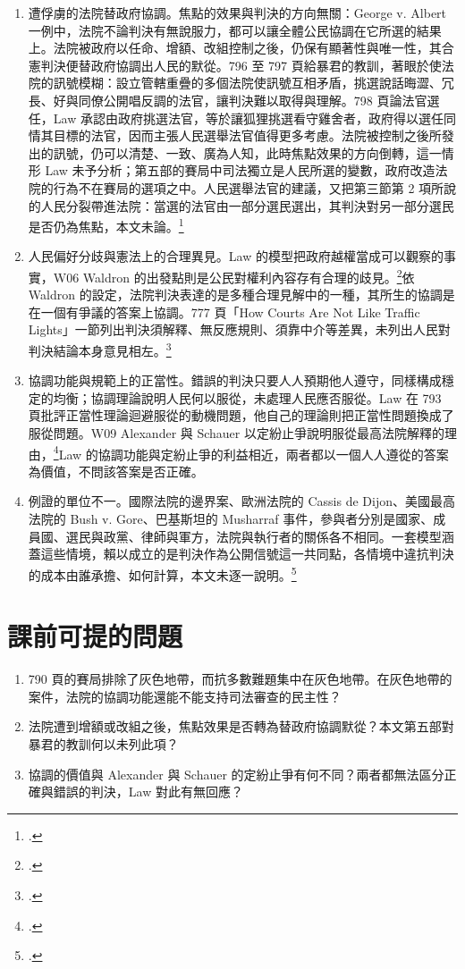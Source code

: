 \begin{enumerate}
\tightlist
\item
  遭俘虜的法院替政府協調。焦點的效果與判決的方向無關：George v. Albert 一例中，法院不論判決有無說服力，都可以讓全體公民協調在它所選的結果上。法院被政府以任命、增額、改組控制之後，仍保有顯著性與唯一性，其合憲判決便替政府協調出人民的默從。796 至 797 頁給暴君的教訓，著眼於使法院的訊號模糊：設立管轄重疊的多個法院使訊號互相矛盾，挑選說話晦澀、冗長、好與同僚公開唱反調的法官，讓判決難以取得與理解。798 頁論法官選任，Law 承認由政府挑選法官，等於讓狐狸挑選看守雞舍者，政府得以選任同情其目標的法官，因而主張人民選舉法官值得更多考慮。法院被控制之後所發出的訊號，仍可以清楚、一致、廣為人知，此時焦點效果的方向倒轉，這一情形 Law 未予分析；第五部的賽局中司法獨立是人民所選的變數，政府改造法院的行為不在賽局的選項之中。人民選舉法官的建議，又把第三節第 2 項所說的人民分裂帶進法院：當選的法官由一部分選民選出，其判決對另一部分選民是否仍為焦點，本文未論。\footcite[764, 787, 796--798]{law2009}
\item
  人民偏好分歧與憲法上的合理異見。Law 的模型把政府越權當成可以觀察的事實，W06 Waldron 的出發點則是公民對權利內容存有合理的歧見。\footcite{waldron2006}依 Waldron 的設定，法院判決表達的是多種合理見解中的一種，其所生的協調是在一個有爭議的答案上協調。777 頁「How Courts Are Not Like Traffic Lights」一節列出判決須解釋、無反應規則、須靠中介等差異，未列出人民對判決結論本身意見相左。\footcite[776--778]{law2009}
\item
  協調功能與規範上的正當性。錯誤的判決只要人人預期他人遵守，同樣構成穩定的均衡；協調理論說明人民何以服從，未處理人民應否服從。Law 在 793 頁批評正當性理論迴避服從的動機問題，他自己的理論則把正當性問題換成了服從問題。W09 Alexander 與 Schauer 以定紛止爭說明服從最高法院解釋的理由，\footcite[457--463]{alexander2000}Law 的協調功能與定紛止爭的利益相近，兩者都以一個人人遵從的答案為價值，不問該答案是否正確。
\item
  例證的單位不一。國際法院的邊界案、歐洲法院的 Cassis de Dijon、美國最高法院的 Bush v. Gore、巴基斯坦的 Musharraf 事件，參與者分別是國家、成員國、選民與政黨、律師與軍方，法院與執行者的關係各不相同。一套模型涵蓋這些情境，賴以成立的是判決作為公開信號這一共同點，各情境中違抗判決的成本由誰承擔、如何計算，本文未逐一說明。\footcite[759--762, 791]{law2009}
\end{enumerate}

\section{課前可提的問題}
\label{sec:20_game-5}

\begin{enumerate}
\tightlist
\item 790 頁的賽局排除了灰色地帶，而抗多數難題集中在灰色地帶。在灰色地帶的案件，法院的協調功能還能不能支持司法審查的民主性？
\item 法院遭到增額或改組之後，焦點效果是否轉為替政府協調默從？本文第五部對暴君的教訓何以未列此項？
\item 協調的價值與 Alexander 與 Schauer 的定紛止爭有何不同？兩者都無法區分正確與錯誤的判決，Law 對此有無回應？
\end{enumerate}
